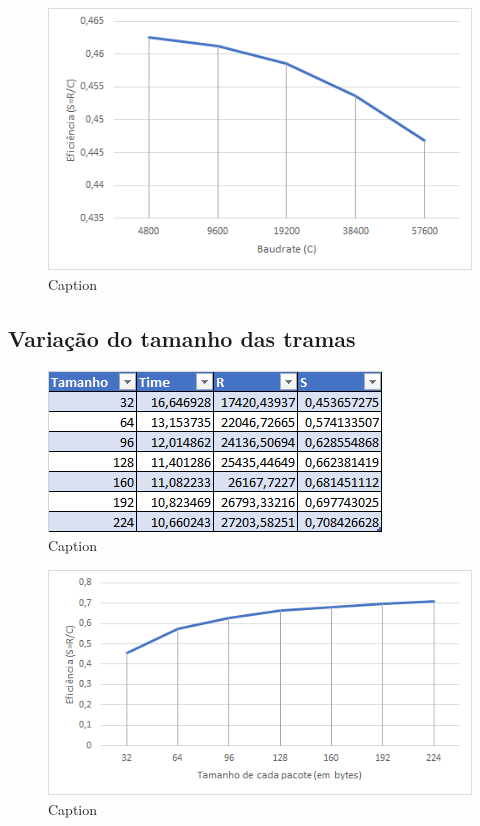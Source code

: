 \documentclass{article}
\begin{document}
\begin{figure}[h]
	\includegraphics[width=\textwidth]{baudrate.png}
	\caption{Caption}
\end{figure}





\subsection{Variação do tamanho das tramas}

\begin{figure}[h]
	\includegraphics[width=\textwidth]{tabelaTamanho.png}
	\caption{Caption}
\end{figure}

\begin{figure}[h]
	\includegraphics[width=\textwidth]{tamanho.png}
	\caption{Caption}
\end{figure}
\end{document}
